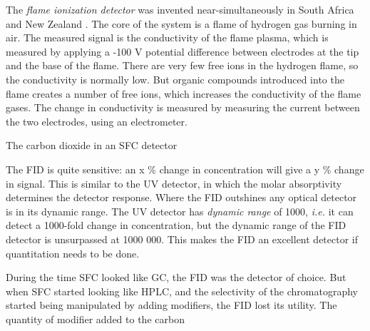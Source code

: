 The \textit{flame ionization detector} was invented near-simultaneously in South
Africa and New Zealand . The core of the system is a
flame of hydrogen gas burning in air. The measured signal is the conductivity of
the flame plasma, which is measured by applying a -100 V potential difference
between electrodes at the tip and the base of the flame. There are very few free
ions in the hydrogen flame, so the conductivity is normally low. But organic
compounds introduced into the flame creates a number of free ions, which
increases the conductivity of the flame gases. The change in conductivity is
measured by measuring the current between the two electrodes, using an electrometer. 

The carbon dioxide in an SFC detector 


The FID is quite sensitive: an x \% change in concentration will give a y \%
change in signal. This is similar to the UV detector, in which the molar
absorptivity determines the detector response. Where the FID outshines any
optical detector is in its dynamic range. The UV detector has \textit{dynamic
range} of 1000, \textit{i.e.} it can detect a 1000-fold change in concentration,
but the dynamic range of the FID detector is unsurpassed at 1000 000. This makes
the FID an excellent detector if quantitation needs to be done.

During the time SFC looked like GC, the FID was the detector of choice. But when SFC
started looking like HPLC, and the selectivity of the chromatography started
being manipulated by adding modifiers, the FID lost its utility. The quantity of modifier added to the carbon

\todos